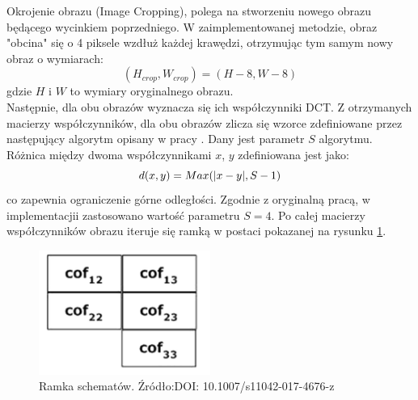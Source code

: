 Okrojenie obrazu (Image Cropping), polega na stworzeniu nowego obrazu będącego wycinkiem poprzedniego. W zaimplementowanej metodzie, obraz "obcina" się o 4 piksele wzdłuż każdej krawędzi, otrzymując tym samym nowy obraz o wymiarach:
\begin{equation}
    (H_{crop}, W_{crop}) = (H - 8, W - 8)
\end{equation}
gdzie $H$ i $W$ to wymiary oryginalnego obrazu.\\

Następnie, dla obu obrazów wyznacza się ich współczynniki DCT. Z otrzymanych macierzy współczynników, dla obu obrazów zlicza się wzorce zdefiniowane przez następujący algorytm opisany w pracy \cite{dct_match_article}. Dany jest parametr $S$ algorytmu. Różnica między dwoma współczynnikami $x$, $y$ zdefiniowana jest jako:
\begin{equation}
    d(x, y) = Max(|x-y|,\space S-1)
\end{equation}
co zapewnia ograniczenie górne odległości. Zgodnie z oryginalną pracą, w implementacjii zastosowano wartość parametru $S=4$. Po całej macierzy współczynników obrazu iteruje się ramką w postaci pokazanej na rysunku \ref{fig:pattern_window}.
\begin{figure}[ht!]
	\centering
	\includegraphics[width=0.5\textwidth]{./img/dct_match_pattern_window.png}
	\caption{\label{fig:pattern_window} Ramka schematów. Źródło:DOI: 10.1007/s11042-017-4676-z}
\end{figure}

